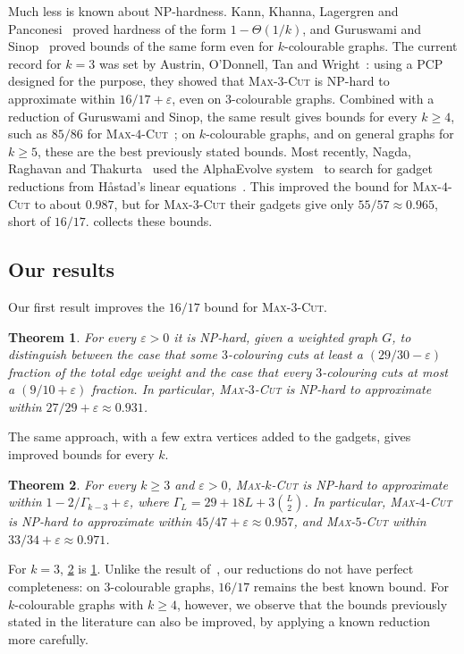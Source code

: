 \documentclass[11pt,letterpaper]{article}
\newtheorem{theorem}{Theorem}[section]
\theoremstyle{remark}
\newcommand{\MC}[1]{\textup{\textsc{Max-$#1$-Cut}}}
\newcommand{\eps}{\varepsilon}
\begin{document}
Much less is known about NP-hardness. Kann, Khanna, Lagergren and Panconesi~\cite{KKLP97} proved hardness
of the form $1-\Theta(1/k)$, and Guruswami and Sinop~\cite{GS13} proved bounds of the same form even for
$k$-colourable graphs. The current
record for $k=3$ was set by Austrin, O'Donnell, Tan and Wright~\cite{AOTW14}: using a PCP designed for the
purpose, they showed that \MC{3} is NP-hard to approximate within $16/17+\eps$, even on $3$-colourable
graphs. Combined with a reduction of Guruswami and Sinop, the same result gives bounds for every
$k\ge4$, such as $85/86$ for \MC{4}~\cite{AOTW14}; on $k$-colourable graphs, and on general graphs for
$k\ge5$, these are the best previously stated bounds. Most recently, Nagda, Raghavan
and Thakurta~\cite{NRT25} used the AlphaEvolve system~\cite{AlphaEvolve} to search for gadget reductions
from H\aa stad's linear equations~\cite{Hastad01}. This improved the bound for \MC{4} to about $0.987$,
but for \MC{3} their gadgets give only $55/57\approx0.965$, short of $16/17$.  collects
these bounds.

\subsection{Our results}

Our first result improves the $16/17$ bound for \MC{3}.

\begin{theorem}\label{thm:main3}
For every $\eps>0$ it is NP-hard, given a weighted graph $G$, to distinguish between the case that some
$3$-colouring cuts at least a $(29/30-\eps)$ fraction of the total edge weight and the case that every
$3$-colouring cuts at most a $(9/10+\eps)$ fraction. In particular, \MC{3} is NP-hard to approximate
within $27/29+\eps\approx 0.931$.
\end{theorem}

The same approach, with a few extra vertices added to the gadgets, gives improved bounds for every $k$.

\begin{theorem}\label{thm:main45}
For every $k\ge3$ and $\eps>0$, \MC{k} is NP-hard to approximate within $1-2/\Gamma_{k-3}+\eps$, where
$\Gamma_L=29+18L+3\binom L2$. In particular, \MC{4} is NP-hard to approximate within $45/47+\eps\approx
0.957$, and \MC{5} within $33/34+\eps\approx0.971$.
\end{theorem}

For $k=3$, \cref{thm:main45} is \cref{thm:main3}. Unlike the result of~\cite{AOTW14}, our reductions
do not have perfect completeness: on $3$-colourable graphs, $16/17$ remains the best known bound. For
$k$-colourable graphs with $k\ge4$, however, we observe that the bounds previously stated in the
literature can also be improved, by applying a known reduction more carefully.
\end{document}
